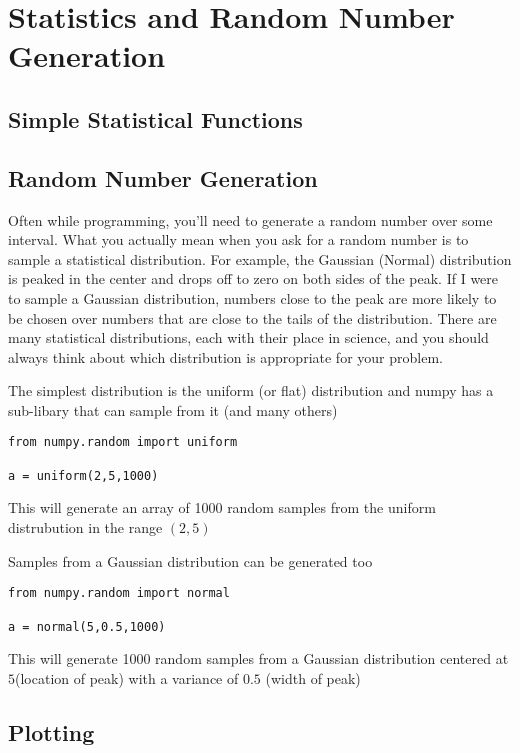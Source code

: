 \chapter{Statistics and Random Number Generation}

\label{chap:Statistics}
\section{Simple Statistical Functions}

\section{Random Number Generation}
Often while programming, you'll need to generate a random number over
some interval.  What you actually mean when you ask for a random
number is to sample a statistical distribution.  For example, the
Gaussian (Normal) distribution is peaked in the center and drops off
to zero on both sides of the peak.  If I were to sample a Gaussian
distribution, numbers close to the peak are more likely to be chosen
over numbers that are close to the tails of the distribution.  There
are many statistical distributions, each with their place in science,
and you should always think about which distribution is appropriate
for your problem.  

The simplest distribution is the uniform (or flat) distribution and
numpy has a sub-libary that can sample from it (and many others)

\begin{Verbatim}
from numpy.random import uniform

a = uniform(2,5,1000)
\end{Verbatim}

This will generate an array of 1000 random samples from the uniform
distrubution in the range $(2,5)$

Samples from a Gaussian distribution can be generated too

\begin{Verbatim}
from numpy.random import normal

a = normal(5,0.5,1000)
\end{Verbatim}

This will generate 1000 random samples from a Gaussian distribution
centered at $5$(location of peak) with a variance of $0.5$ (width of peak)


\section{Plotting}

